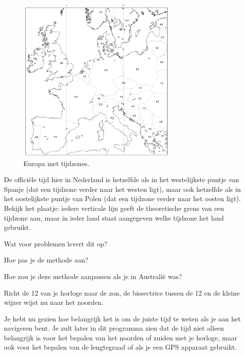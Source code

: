 \begin{figure}
    \centering
    \includegraphics[width=0.7\textwidth]{europe_timezone_plus.png}
    \caption{Europa met tijdzones.}
\end{figure}

\begin{opgave}
    De offici\"ele tijd hier in Nederland is hetzelfde als in het westelijkste puntje van Spanje (dat een tijdzone verder naar het westen ligt), maar ook hetzelfde als in het oostelijkste puntje van Polen (dat een tijdzone verder naar het oosten ligt). Bekijk het plaatje: iedere verticale lijn geeft de theoretische grens van een tijdzone aan, maar in ieder land staat aangegeven welke tijdzone het land gebruikt. 
    \begin{subopgave}
        Wat voor problemen levert dit op?
    \end{subopgave}
    \begin{subopgave}[\ster]
        Hoe pas je de methode aan?
    \end{subopgave}
\end{opgave}

\begin{opgave}
    Hoe zou je deze methode aanpassen als je in Australi\"{e} was?
    \begin{antwoord}
        Richt de 12 van je horloge naar de zon, de bissectrice tussen de 12 en de kleine wijzer wijst nu naar het noorden.
    \end{antwoord}
\end{opgave}

Je hebt nu gezien hoe belangrijk het is om de juiste tijd te weten als je aan het navigeren bent. Je zult later in dit programma zien dat de tijd niet alleen belangrijk is voor het bepalen van het noorden of zuiden met je horloge, maar ook voor het bepalen van de lengtegraad of als je een GPS apparaat gebruikt.
